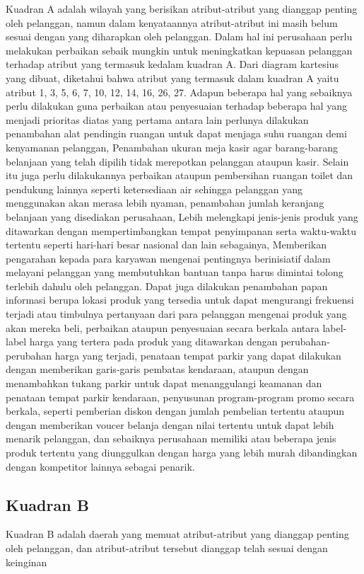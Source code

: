 Kuadran A adalah wilayah yang berisikan atribut-atribut yang dianggap penting oleh pelanggan, namun dalam kenyataannya atribut-atribut ini masih belum sesuai
dengan yang diharapkan oleh pelanggan. Dalam hal ini perusahaan perlu melakukan perbaikan sebaik mungkin untuk meningkatkan kepuasan pelanggan terhadap
atribut yang termasuk kedalam kuadran A. Dari diagram kartesius yang dibuat, diketahui bahwa atribut yang termasuk dalam kuadran A yaitu atribut 1, 3, 5, 6, 7,
10, 12, 14, 16, 26, 27.
Adapun beberapa hal yang sebaiknya perlu dilakukan guna perbaikan atau penyesuaian terhadap beberapa hal yang menjadi prioritas diatas yang pertama antara lain
perlunya dilakukan penambahan alat pendingin ruangan untuk dapat menjaga suhu ruangan demi kenyamanan pelanggan, Penambahan ukuran meja kasir agar barang-barang belanjaan yang telah dipilih
tidak merepotkan pelanggan ataupun kasir. Selain itu juga perlu dilakukannya perbaikan ataupun pembersihan ruangan toilet dan pendukung lainnya seperti ketersediaan air
sehingga pelanggan yang menggunakan akan merasa lebih nyaman, penambahan jumlah keranjang belanjaan yang disediakan perusahaan, Lebih melengkapi jenis-jenis
produk yang ditawarkan dengan mempertimbangkan tempat penyimpanan serta waktu-waktu tertentu seperti hari-hari besar nasional dan lain sebagainya, Memberikan pengarahan kepada para
karyawan mengenai pentingnya berinisiatif dalam melayani pelanggan yang membutuhkan bantuan tanpa harus dimintai tolong terlebih dahulu oleh pelanggan.
Dapat juga dilakukan penambahan papan informasi berupa lokasi produk yang tersedia untuk dapat mengurangi frekuensi terjadi atau timbulnya pertanyaan dari para
pelanggan mengenai produk yang akan mereka beli, perbaikan ataupun penyesuaian secara berkala antara label-label harga yang tertera pada produk yang ditawarkan dengan perubahan-perubahan
harga yang terjadi, penataan tempat parkir yang dapat dilakukan dengan memberikan garis-garis pembatas kendaraan, ataupun dengan menambahkan tukang parkir untuk
dapat menanggulangi keamanan dan penataan tempat parkir kendaraan, penyusunan program-program promo secara berkala, seperti pemberian diskon dengan jumlah pembelian tertentu ataupun dengan
memberikan voucer belanja dengan nilai tertentu untuk dapat lebih menarik pelanggan, dan sebaiknya perusahaan memiliki atau beberapa jenis produk tertentu
yang diunggulkan dengan harga yang lebih murah dibandingkan dengan kompetitor lainnya sebagai penarik.
\subsection{Kuadran B}
Kuadran B adalah daerah yang memuat atribut-atribut yang dianggap penting oleh pelanggan, dan atribut-atribut tersebut dianggap telah sesuai dengan keinginan

